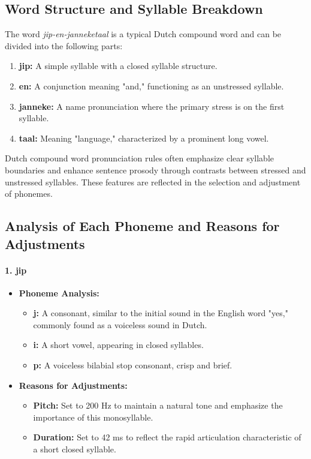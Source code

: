 \documentclass{../labbook}
\begin{document}
\begin{solution}
\subsection*{Word Structure and Syllable Breakdown}
The word \textit{jip-en-janneketaal} is a typical Dutch compound word and can be divided into the following parts:
\begin{enumerate}
    \item \textbf{jip:} A simple syllable with a closed syllable structure.
    \item \textbf{en:} A conjunction meaning "and," functioning as an unstressed syllable.
    \item \textbf{janneke:} A name pronunciation where the primary stress is on the first syllable.
    \item \textbf{taal:} Meaning "language," characterized by a prominent long vowel.
\end{enumerate}

Dutch compound word pronunciation rules often emphasize clear syllable boundaries and enhance sentence prosody through contrasts between stressed and unstressed syllables. These features are reflected in the selection and adjustment of phonemes.

\subsection*{Analysis of Each Phoneme and Reasons for Adjustments}

\paragraph{1. jip}
\begin{itemize}
    \item \textbf{Phoneme Analysis:}
        \begin{itemize}
            \item \textbf{j:} A consonant, similar to the initial sound in the English word "yes," commonly found as a voiceless sound in Dutch.
            \item \textbf{i:} A short vowel, appearing in closed syllables.
            \item \textbf{p:} A voiceless bilabial stop consonant, crisp and brief.
        \end{itemize}
    \item \textbf{Reasons for Adjustments:}
        \begin{itemize}
            \item \textbf{Pitch:} Set to 200 Hz to maintain a natural tone and emphasize the importance of this monosyllable.
            \item \textbf{Duration:} Set to 42 ms to reflect the rapid articulation characteristic of a short closed syllable.
        \end{itemize}
\end{itemize}


\end{solution}
\end{document}
